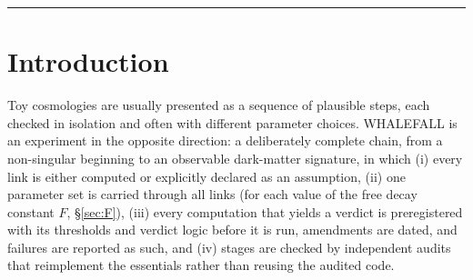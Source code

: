\documentclass[11pt,a4paper]{article}
\begin{document}
\begin{abstract}
So is the coherence of the parent's bounces under perturbations of inflationary amplitude. Evolving the parent through its bounce with dust and an inhomogeneous inflaton gives, in a preregistered test, the same tolerance as a dust model: $12$--$18\%$ of fertile births are direct, non-eternal children that bounce coherently and need the plateau flat only up to their landing value, against $1.8$--$2.9\%$ for eternal children. Most of these direct children bounce once ($11$--$16\%$ of fertile births); for the rest the coherence is extrapolated from one bounce to several, an extrapolation that we now think optimistic.
The parent need not contain dust: a closed patch of pure radiation gives $64$ children below the Planck density, and an independent audit finds $10.5\%$ of fertile births to be direct children whose parent bounces coherently, $4.3\%$ with a single bounce. Whether such a patch can form inside an earlier radiation era is not established; in the cases computed it does not.
The best estimate is cold pseudo-Goldstone dark matter, $96$--$99\%$ of it from the collapse, with $F\approx0.06$--$0.5F_0$, $m_G\approx10^{-17}$--$10^{-13}$\,eV, a small-scale suppression of at most a few per cent at $k=10\,h$/Mpc near the upper edge, white-noise isocurvature below current bounds, $\Delta N_{\rm eff}\lesssim3\times10^{-3}$, and no string signal in LISA.
We list every open assumption, failed gate and superseded statement.
\end{abstract}

\clearpage
\tableofcontents
\bigskip\hrule\bigskip

\section{Introduction}

Toy cosmologies are usually presented as a sequence of plausible steps, each checked in isolation and often with different parameter choices.
WHALEFALL is an experiment in the opposite direction: a deliberately complete chain, from a non-singular beginning to an observable dark-matter signature, in which
(i) every link is either computed or explicitly declared as an assumption,
(ii) one parameter set is carried through all links (for each value of the free decay constant $F$, \S\ref{sec:F}),
(iii) every computation that yields a verdict is preregistered with its thresholds and verdict logic before it is run, amendments are dated, and failures are reported as such, and
(iv) stages are checked by independent audits that reimplement the essentials rather than reusing the audited code.
\end{document}
